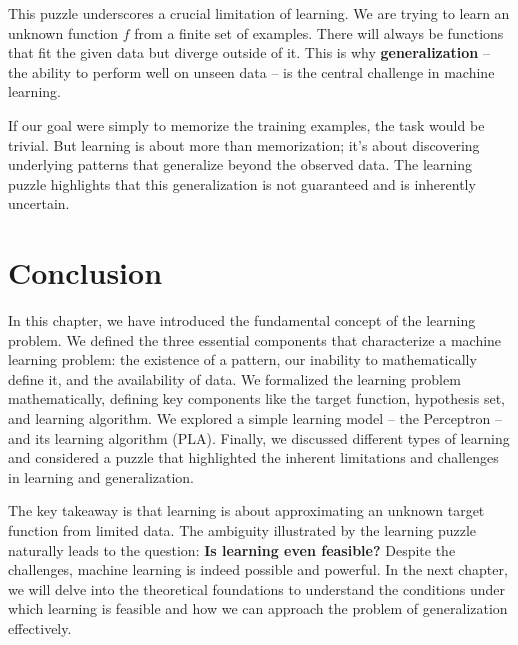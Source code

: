 \documentclass{article}
\begin{document}
This puzzle underscores a crucial limitation of learning. We are trying to learn an unknown function \(f\) from a finite set of examples.  There will always be functions that fit the given data but diverge outside of it.  This is why \textbf{generalization} – the ability to perform well on unseen data – is the central challenge in machine learning.

If our goal were simply to memorize the training examples, the task would be trivial. But learning is about more than memorization; it's about discovering underlying patterns that generalize beyond the observed data. The learning puzzle highlights that this generalization is not guaranteed and is inherently uncertain.

\section{Conclusion}

In this chapter, we have introduced the fundamental concept of the learning problem. We defined the three essential components that characterize a machine learning problem: the existence of a pattern, our inability to mathematically define it, and the availability of data. We formalized the learning problem mathematically, defining key components like the target function, hypothesis set, and learning algorithm.  We explored a simple learning model – the Perceptron – and its learning algorithm (PLA).  Finally, we discussed different types of learning and considered a puzzle that highlighted the inherent limitations and challenges in learning and generalization.

The key takeaway is that learning is about approximating an unknown target function from limited data. The ambiguity illustrated by the learning puzzle naturally leads to the question: \textbf{Is learning even feasible?}  Despite the challenges, machine learning is indeed possible and powerful.  In the next chapter, we will delve into the theoretical foundations to understand the conditions under which learning is feasible and how we can approach the problem of generalization effectively.
\end{document}
